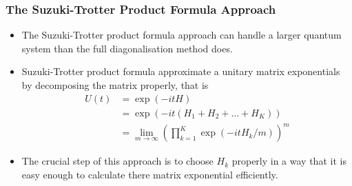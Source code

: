 \documentclass{beamer}
\begin{document}
\begin{frame}
	\frametitle{The Suzuki-Trotter Product Formula Approach}
	\begin{itemize}
		\item The Suzuki-Trotter product formula approach can handle a larger quantum system than the full diagonalisation method does.
		\item Suzuki-Trotter product formula approximate a unitary matrix exponentials by decomposing the matrix properly, that is 
		\begin{equation*}
		\label{suzuki-trotter product formula}
		\begin{split}
		U(t) &= \exp(-it H)\\
		&=\exp(-it(H_1+H_2+\dots+H_K))\\
		&=\lim_{m \to \infty}(\prod_{k=1}^{K}\exp(-it H_k/m))^m
		\end{split}
		\end{equation*}
		\item  The crucial step of this approach is to choose $H_k$ properly in a way that it is easy enough to calculate there matrix exponential efficiently.
	\end{itemize}
\end{frame}
\end{document}
